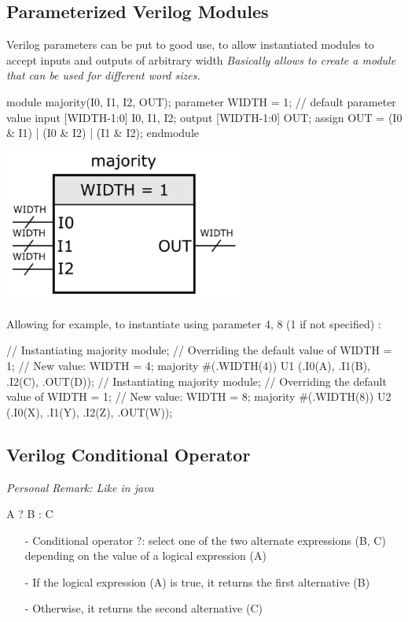 \documentclass[12pt,openany]{book}
\begin{document}
\subsection{Parameterized Verilog Modules}
Verilog parameters can be put to good use, to allow instantiated modules to accept inputs and outputs of arbitrary width
\newline
\textit{Basically allows to create a module that can be used for different word sizes.}\newline

\begin{minipage}[htp]{0.45\textwidth}
	\begin{vhdl}
module majority(I0, I1, I2, OUT);
	parameter WIDTH = 1; // default parameter value
	input [WIDTH-1:0] I0, I1, I2;
	output [WIDTH-1:0] OUT;
	assign OUT = (I0 & I1) | (I0 & I2) | (I1 & I2);
endmodule
	\end{vhdl}
\end{minipage}
\hfill
\hspace*{20px}
\vline
\hspace*{20px}
\hfill
\begin{minipage}[htp]{0.55\textwidth}
\includegraphics[width=0.6\textwidth]{circuits/16.3.3.png}
\end{minipage}

Allowing for example, to instantiate using parameter 4, 8 (1 if not specified) :
\begin{vhdl}
// Instantiating majority module;
// Overriding the default value of WIDTH = 1;
// New value: WIDTH = 4;
majority #(.WIDTH(4)) U1 (.I0(A), .I1(B), .I2(C), .OUT(D));
// Instantiating majority module;
// Overriding the default value of WIDTH = 1;
// New value: WIDTH = 8;
majority #(.WIDTH(8)) U2 (.I0(X), .I1(Y), .I2(Z), .OUT(W));
\end{vhdl}

\subsection{Verilog Conditional Operator}
\textit{Personal Remark: Like in java}
\begin{vhdl}
A ? B : C
\end{vhdl}
\begin{itemize}
\item[-] Conditional operator ?: select one of the two alternate expressions (B, C) depending on the value of a logical expression (A)
\item[-] If the logical expression (A) is true, it returns the first alternative (B)
\item[-] Otherwise, it returns the second alternative (C)
\end{itemize}
\end{document}
